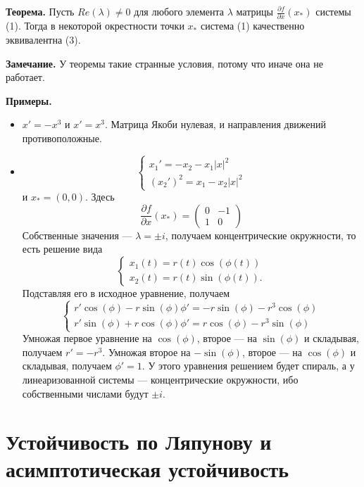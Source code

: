 \textbf{Теорема.} Пусть $Re(\lambda) \ne 0$ для любого элемента $\lambda$ матрицы $\frac{\partial f}{\partial x}(x_*)$ системы (1).
Тогда в некоторой окрестности точки $x_*$ система (1) качественно эквивалентна (3).

\textbf{Замечание.} У теоремы такие странные условия, потому что иначе она не работает.

\textbf{Примеры.}
\begin{itemize}
    \item $x' = -x^3$ и $x' = x^3$. Матрица Якоби нулевая, и направления движений противоположные.
    \item
        \[
            \begin{cases}
                x_1' = -x_2 - x_1|x|^2 \\
                (x_2')^2 = x_1 - x_2|x|^2
            \end{cases}
        \]
        и $x_* = (0, 0)$.
        Здесь
        \[
            \frac{\partial f}{\partial x}(x_*) =
            \begin{pmatrix}
                0 & -1 \\
                1 & 0
            \end{pmatrix}
        \]
        Собственные значения --- $\lambda = \pm i$, получаем концентрические окружности, то есть решение вида
        \[
            \begin{cases}
                x_1(t) = r(t) \cos(\phi(t)) \\
                x_2(t) = r(t) \sin(\phi(t)).
            \end{cases}
        \]
        Подставляя его в исходное уравнение, получаем
        \[
            \begin{cases}
                r' \cos(\phi) - r \sin(\phi) \phi' = -r \sin(\phi) - r^3 \cos(\phi) \\
                r' \sin(\phi) + r \cos(\phi) \phi' = r \cos(\phi) - r^3 \sin(\phi)
            \end{cases}
        \]
        Умножая первое уравнение на $\cos(\phi)$, второе --- на $\sin(\phi)$ и складывая, получаем $r' = -r^3$.
        Умножая второе на $-\sin(\phi)$, второе --- на $\cos(\phi)$ и складывая, получаем $\phi' = 1$.
        У этого уравнения решением будет спираль, а у линеаризованной системы --- концентрические окружности, ибо собственными числами будут $\pm i$.
\end{itemize}

\setcounter{equation}{0}
\section{Устойчивость по Ляпунову и асимптотическая устойчивость}
